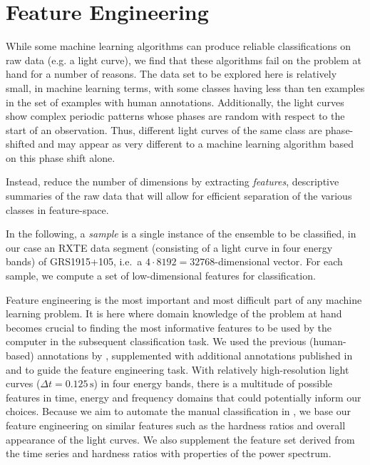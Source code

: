 \documentclass[12pt]{emulateapj}
\begin{document}
\section{Feature Engineering}
\label{sec:featureengineering}

While some machine learning algorithms can produce reliable classifications on raw data (e.g. a light curve), we find that these algorithms fail on the problem at hand for a number of reasons. The data set to be explored here is relatively small, in machine learning terms, with some classes having less than ten examples in the set of examples with human annotations. Additionally, the light curves show complex periodic patterns whose phases are random with respect to the start of an observation. Thus, different light curves of the same class are phase-shifted and may appear as very different to a machine learning algorithm based on this phase shift alone.

Instead, reduce the number of dimensions by extracting \textit{features}, descriptive summaries of the raw data that will allow for efficient separation of the various classes in feature-space.

In the following, a \textit{sample} is a single instance of the ensemble to be classified, in our case an RXTE data segment (consisting of a light curve in four energy bands) of GRS1915+105, i.e.\ a $4 \cdot 8192 = 32768$-dimensional vector. For each sample, we compute a set of low-dimensional features for classification. %

Feature engineering is the most important and most difficult part of any machine learning problem. It is here where domain knowledge of the problem at hand becomes crucial to finding the most informative features to be used by the computer in the subsequent classification task. 
We used the previous (human-based) annotations by \citet{belloni2000}, supplemented with additional annotations published in \citet{kleinwolt2002} and \citet{hannikainen2003} to guide the feature engineering task. With relatively high-resolution light curves ($\Delta t = 0.125 \,\mathrm{s}$) in four energy bands, there is a multitude of possible features in time, energy and frequency domains that could potentially inform our choices. Because we aim to automate the manual classification in \citet{belloni2000}, we base our feature engineering on similar features such as the hardness ratios and overall appearance of the light curves. We also supplement the feature set derived from the time series and hardness ratios with properties of the power spectrum.
\end{document}

